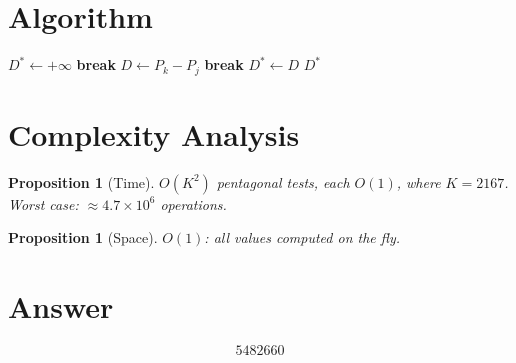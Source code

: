 \documentclass[12pt]{article}
\newtheorem{proposition}[theorem]{Proposition}
\begin{document}
\section{Algorithm}

\begin{algorithm}[H]
\caption{Minimum Pentagonal Difference}
\begin{algorithmic}[1]
\State $D^* \gets +\infty$
     \textbf{break} 
    \EndIf
        \State $D \gets P_k - P_j$
         \textbf{break} 
        \EndIf
            \State $D^* \gets D$
        \EndIf
    \EndFor
\EndFor
\State \Return $D^*$
\end{algorithmic}
\end{algorithm}

\section{Complexity Analysis}

\begin{proposition}[Time]
$O(K^2)$ pentagonal tests, each $O(1)$, where $K = 2167$. Worst case: $\approx 4.7 \times 10^6$ operations.
\end{proposition}

\begin{proposition}[Space]
$O(1)$: all values computed on the fly.
\end{proposition}

\section{Answer}

\[
\boxed{5482660}
\]
\end{document}
